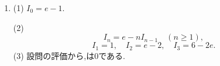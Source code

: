 \begin{enumerate}[label=\textbf{問\arabic*.},leftmargin=3.8em,format=\bookitemlink{practice-bridge}{answer}{problem}]
                (2)
                \[
                  z_n=(2+\sqrt3)^n,\qquad w_n=(2-\sqrt3)^n,
                \]
                \[
                  x_n=\frac{(2+\sqrt3)^n+(2-\sqrt3)^n}{2},
                \]
                \[
                  y_n=\frac{(2+\sqrt3)^n-(2-\sqrt3)^n}{2\sqrt3}.
                \]
                (3) $\displaystyle n\ge1$の$\displaystyle (x_n,y_n)$は相異なる正の整数解である.
          \item (1) $\displaystyle I_0=e-1$.
                \par\smallskip\noindent
                (2)
                \[
                  I_n=e-nI_{n-1}\quad(n\ge1),
                \]
                \[
                  I_1=1,\quad I_2=e-2,\quad I_3=6-2e.
                \]
                (3) 設問の評価から,は$\displaystyle 0$である.
        \end{enumerate}

